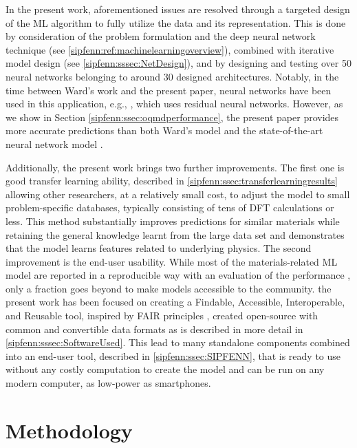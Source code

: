 In the present work, aforementioned issues are resolved through a targeted design of the ML algorithm to fully utilize the data and its representation. This is done by consideration of the problem formulation and the deep neural network technique (see \ref{sipfenn:ref:machinelearningoverview}), combined with iterative model design (see \ref{sipfenn:sssec:NetDesign}), and by designing and testing over 50 neural networks belonging to around 30 designed architectures. Notably, in the time between Ward's work and the present paper, neural networks have been used in this application, e.g., \cite{Jha2019IRNet}, which uses residual neural networks. However, as we show in Section \ref{sipfenn:ssec:oqmdperformance}, the present paper provides more accurate predictions than both Ward's model and the state-of-the-art neural network model \cite{Jha2019IRNet}.

Additionally, the present work brings two further improvements. The first one is good transfer learning ability, described in \ref{sipfenn:ssec:transferlearningresults} allowing other researchers, at a relatively small cost, to adjust the model to small problem-specific databases, typically consisting of tens of DFT calculations or less. This method substantially improves predictions for similar materials while retaining the general knowledge learnt from the large data set and demonstrates that the model learns features related to underlying physics. The second  improvement is the end-user usability. While most of the materials-related ML model are reported in a reproducible way with an evaluation of the performance \cite{Ward2017IncludingTessellations, Schutt2014HowProperties, Schutt2018SchNetMaterials, Seko2017RepresentationProperties}, only a fraction goes beyond to make models accessible to the community. the present work has been focused on creating a Findable, Accessible, Interoperable, and Reusable tool, inspired by FAIR principles \cite{FAIRFAIR}, created open-source with common and convertible data formats as is described in more detail in \ref{sipfenn:sssec:SoftwareUsed}. This lead to many standalone components combined into an end-user tool, described in \ref{sipfenn:ssec:SIPFENN}, that is ready to use without any costly computation to create the model and can be run on any modern computer, as low-power as smartphones.

\section{Methodology} \label{sipfenn:sec:methodology}

